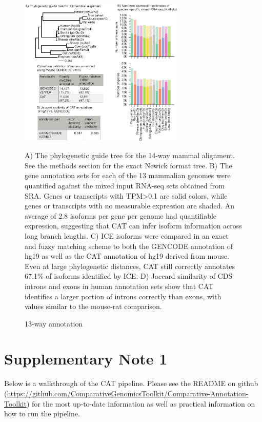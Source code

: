 \documentclass[fleqn,10pt]{wlscirep}
\newcommand{\beginsupplement}{%
    \setcounter{table}{0}
    \renewcommand{\thetable}{S\arabic{table}}%
    \setcounter{figure}{0}
    \renewcommand{\thefigure}{S\arabic{figure}}%
   }
\begin{document}
\begin{figure}
\centering
\includegraphics[width=0.7\textwidth,height=0.7\textheight,keepaspectratio]{13way-v4.pdf}
\caption{13-way annotation}
A) The phylogenetic guide tree for the 14-way mammal alignment. See the methods section for the exact Newick format tree. B) The gene annotation sets for each of the 13 mammalian genomes were quantified against the mixed input RNA-seq sets obtained from SRA. Genes or transcripts with TPM\textgreater 0.1 are solid colors, while genes or transcripts with no measurable expression are shaded. An average of 2.8 isoforms per gene per genome had quantifiable expression, suggesting that CAT can infer isoform information across long branch lengths. C) ICE isoforms were compared in an exact and fuzzy matching scheme to both the GENCODE annotation of hg19 as well as the CAT annotation of hg19 derived from mouse. Even at large phylogenetic distances, CAT still correctly annotates 67.1\% of isoforms identified by ICE. D) Jaccard similarity of CDS introns and exons in human annotation sets show that CAT identifies a larger portion of introns correctly than exons, with values similar to the mouse-rat comparison.
\label{fig:13way}
\end{figure}

\clearpage
\beginsupplement

\section*{Supplementary Note 1}

Below is a walkthrough of the CAT pipeline. Please see the README on github (\url{https://github.com/ComparativeGenomicsToolkit/Comparative-Annotation-Toolkit}) for the most up-to-date information as well as practical information on how to run the pipeline. 
\end{document}
